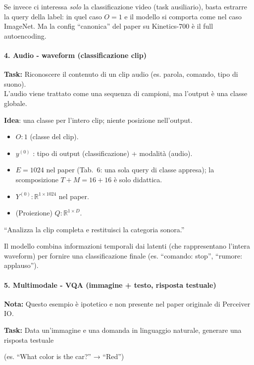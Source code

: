 \documentclass[
  11pt,
]{article}
\begin{document}
Se invece ci interessa \emph{solo} la classificazione video (task ausiliario), basta estrarre la query della label: in quel caso $O = 1$ e il modello si comporta come nel caso ImageNet. Ma la config ``canonica'' del paper su Kinetics-700 è il full autoencoding.

\paragraph{4. \textbf{Audio - waveform (classificazione clip)}}

\textbf{Task:} Riconoscere il contenuto di un clip audio (es. parola,
comando, tipo di suono).\\
L'audio viene trattato come una sequenza di campioni, ma l'output è una
classe globale.

\textbf{Idea}: una classe per l'intero clip; niente
posizione nell'output.

\begin{itemize}
\item
  \(O:1\) (classe del clip).
\item
  \(y^{(0)}\) : tipo di output (classificazione) + modalità (audio).
\item
  \(E = 1024\) nel paper (Tab.~6: una sola query di classe appresa); la scomposizione \(T + M = 16 + 16\) è solo didattica.
\item
  \(Y^{(0)}:\mathbb{R}^{1 \times 1024}\) nel paper.
\item
  (Proiezione) \(Q:\mathbb{R}^{1 \times D}\).
\end{itemize}


``Analizza la clip completa e restituisci la categoria sonora.''

Il modello combina informazioni temporali dai latenti (che rappresentano
l'intera waveform) per fornire una classificazione finale (es.
``comando: stop'', ``rumore: applauso'').


\paragraph{5. \textbf{Multimodale - VQA (immagine + testo, risposta testuale)}}

\textbf{Nota:} Questo esempio è ipotetico e non presente nel paper originale di Perceiver IO.

\textbf{Task:} Data un'immagine e una domanda in linguaggio naturale,
generare una risposta testuale

(es. ``What color is the car?'' → ``Red'')
\end{document}
